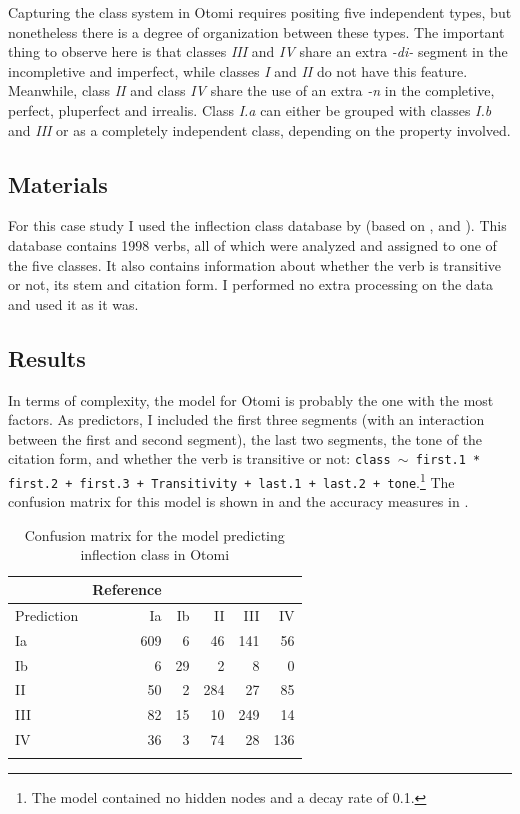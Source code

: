 Capturing the class system in Otomi requires positing five independent types, but nonetheless there is a degree of organization between these types. The important thing to observe here is that classes \textit{III} and \textit{IV} share an extra \textit{-di-} segment in the incompletive and imperfect, while classes \textit{I} and \textit{II} do not have this feature. Meanwhile, class \textit{II} and class \textit{IV} share the use of an extra \textit{-n} in the completive, perfect, pluperfect and irrealis. Class \textit{I.a} can either be grouped with classes \textit{I.b} and \textit{III} or as a completely independent class, depending on the property involved.

\subsection{Materials}

For this case study I used the inflection class database by \textcite{Feist.2015} (based on \citealt{Echegoyen.1979}, \citealt{Echegoyen.2007} and \citealt{Voigtlander.2007}). This database contains 1998 verbs, all of which were analyzed and assigned to one of the five classes. It also contains information about whether the verb is transitive or not, its stem and citation form. I performed no extra processing on the data and used it as it was.

\subsection{Results}

In terms of complexity, the model for Otomi is probably the one with the most factors. As predictors, I included the first three segments (with an interaction between the first and second segment), the last two segments, the tone of the citation form, and whether the verb is transitive or not: \texttt{class $\sim$ first.1 * first.2 + first.3 + Transitivity + last.1 + last.2 + tone}.\footnote{The model contained no hidden nodes and a decay rate of 0.1.} The confusion matrix for this model is shown in  and the accuracy measures in .

\begin{table}
  \centering
  \begin{tabular}{lrrrrr}
    \lsptoprule
               & Reference                  \\
    \midrule
    Prediction & Ia  & Ib & II  & III & IV  \\
    Ia         & 609 & 6  & 46  & 141 & 56  \\
    Ib         & 6   & 29 & 2   & 8   & 0   \\
    II         & 50  & 2  & 284 & 27  & 85  \\
    III        & 82  & 15 & 10  & 249 & 14  \\
    IV         & 36  & 3  & 74  & 28  & 136 \\
    \lspbottomrule
  \end{tabular}
    \caption{Confusion matrix for the model predicting inflection class in Otomi}
  \label{tab:class-otomi-cm}
\end{table}

